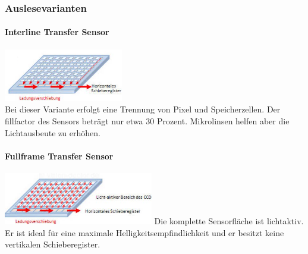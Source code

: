 \subsubsection{Auslesevarianten}
\begin{multicols}{2}
    \paragraph{Interline Transfer Sensor}
    \includegraphics[width=0.39\textwidth]{images/ccd_interline} \\
    Bei dieser Variante erfolgt eine Trennung von Pixel und Speicherzellen. Der fillfactor des Sensors beträgt nur etwa 30 Prozent. Mikrolinsen helfen aber die Lichtausbeute zu erhöhen.
    
    \paragraph{Fullframe Transfer Sensor}
    \includegraphics[width=0.49\textwidth]{images/ccd_fullframe}
    Die komplette Sensorfläche ist lichtaktiv. Er ist ideal für eine maximale Helligkeitsempfindlichkeit und er besitzt keine vertikalen Schieberegister. 
\end{multicols}